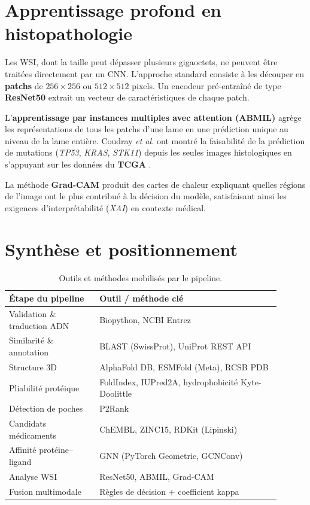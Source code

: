 \documentclass[12pt,a4paper,oneside]{book}
\begin{document}
\section{Apprentissage profond en histopathologie}

Les WSI, dont la taille peut dépasser plusieurs gigaoctets, ne peuvent être
traitées directement par un CNN. L'approche standard consiste à les découper
en \textbf{patchs} de $256\times256$ ou $512\times512$ pixels. Un encodeur
pré-entraîné de type \textbf{ResNet50} \cite{he2016resnet} extrait un vecteur
de caractéristiques de chaque patch.

L'\textbf{apprentissage par instances multiples avec attention (ABMIL)}
\cite{ilse2018abmil} agrège les représentations de tous les patchs d'une
lame en une prédiction unique au niveau de la lame entière. Coudray
\textit{et al.} \cite{coudray2018classification} ont montré la faisabilité
de la prédiction de mutations (\textit{TP53}, \textit{KRAS}, \textit{STK11})
depuis les seules images histologiques en s'appuyant sur les données du
\textbf{TCGA} \cite{weinstein2013tcga}.

La méthode \textbf{Grad-CAM} \cite{selvaraju2017gradcam} produit des cartes
de chaleur expliquant quelles régions de l'image ont le plus contribué à la
décision du modèle, satisfaisant ainsi les exigences d'interprétabilité
(\textit{XAI}) en contexte médical.

\section{Synthèse et positionnement}

\begin{table}[H]
\caption{Outils et méthodes mobilisés par le pipeline.}
\label{tab:outils}
\centering
\renewcommand{\arraystretch}{1.3}
\begin{tabular}{L{0.30\linewidth} L{0.60\linewidth}}
\toprule
\textbf{Étape du pipeline} & \textbf{Outil / méthode clé} \\
\midrule
Validation \& traduction ADN  & Biopython, NCBI Entrez \\
Similarité \& annotation       & BLAST (SwissProt), UniProt REST API \\
Structure 3D                   & AlphaFold DB, ESMFold (Meta), RCSB PDB \\
Pliabilité protéique           & FoldIndex, IUPred2A, hydrophobicité Kyte-Doolittle \\
Détection de poches            & P2Rank \\
Candidats médicaments          & ChEMBL, ZINC15, RDKit (Lipinski) \\
Affinité protéine--ligand      & GNN (PyTorch Geometric, GCNConv) \\
Analyse WSI                    & ResNet50, ABMIL, Grad-CAM \\
Fusion multimodale             & Règles de décision + coefficient kappa \\
\bottomrule
\end{tabular}
\end{table}
\end{document}

